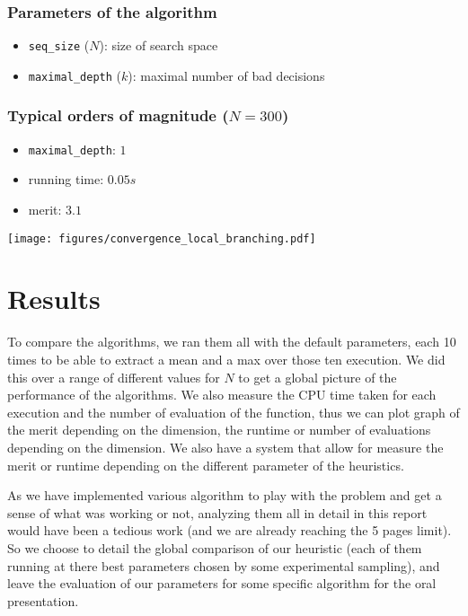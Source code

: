 \documentclass{article}
\begin{document}
  \pagebreak
  \begin{multicols}{2}
    \subsubsection*{Parameters of the algorithm}
      \begin{itemize}
        \item \texttt{seq\_size} ($N$): size of search space
        \item \texttt{maximal\_depth} ($k$): maximal number of bad decisions
      \end{itemize}

    \subsubsection*{Typical orders of magnitude ($N = 300$)}
      \begin{itemize}
        \item \texttt{maximal\_depth}: $1$
        \item running time: $0.05s$
        \item merit: $3.1$
      \end{itemize}

    \vphantom{0}
  \columnbreak
    \texttt{[image: figures/convergence\_local\_branching.pdf]}
  \end{multicols}


\section{Results}

  To compare the algorithms, we ran them all with the default parameters, each
  10 times to be able to extract a mean and a max over those ten execution. We
  did this over a range of different values for $N$ to get a global picture of
  the performance of the algorithms. We also measure the CPU time taken for each
  execution and the number of evaluation of the function, thus we can plot
  graph of the merit depending on the dimension, the runtime or number of
  evaluations depending on the dimension. We also have a system that allow for
  measure the merit or runtime depending on the different parameter of the
  heuristics.

  As we have implemented various algorithm to play with the problem and get a
  sense of what was working or not, analyzing them all in detail in this report
  would have been a tedious work (and we are already reaching the 5 pages
  limit). So we choose to detail the global comparison of our heuristic (each
  of them running at there best parameters chosen by some experimental
  sampling), and leave the evaluation of our parameters for some specific
  algorithm for the oral presentation.
\end{document}
